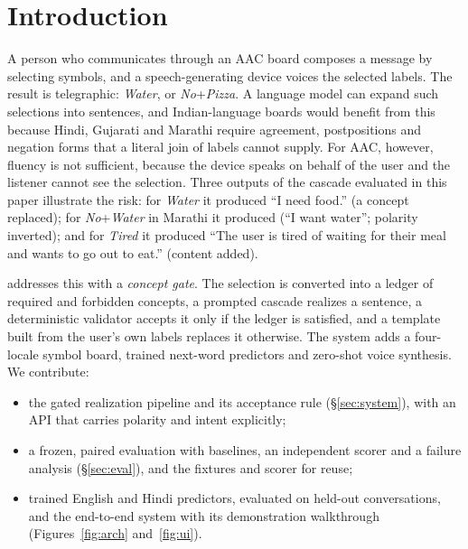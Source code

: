 \section{Introduction}
\label{sec:intro}

A person who communicates through an AAC board composes a message by selecting symbols, and a speech-generating device voices the selected labels.
The result is telegraphic: \emph{Water}, or \emph{No}+\emph{Pizza}. A language model can expand such selections into sentences, and Indian-language boards would benefit from this because Hindi, Gujarati and Marathi require agreement, postpositions and negation forms that a literal join of labels cannot supply.
For AAC, however, fluency is not sufficient, because the device speaks on behalf of the user and the listener cannot see the selection.
Three outputs of the cascade evaluated in this paper illustrate the risk: for \emph{Water} it produced ``I need food.'' (a concept replaced); for \emph{No}+\emph{Water} in Marathi it produced  (``I want water''; polarity inverted); and for \emph{Tired} it produced ``The user is tired of waiting for their meal and wants to go out to eat.'' (content added).

\sys{} addresses this with a \emph{concept gate}. The selection is converted into a ledger of required and forbidden concepts, a prompted cascade realizes a sentence, a deterministic validator accepts it only if the ledger is satisfied, and a template built from the user's own labels replaces it otherwise.
The system adds a four-locale symbol board, trained next-word predictors and zero-shot voice synthesis. We contribute:
\begin{itemize}
\item the gated realization pipeline and its acceptance rule (\S\ref{sec:system}), with an API that carries polarity and intent explicitly;
\item a frozen, paired evaluation with baselines, an independent scorer and a failure analysis (\S\ref{sec:eval}), and the fixtures and scorer for reuse;
\item trained English and Hindi predictors, evaluated on held-out conversations, and the end-to-end system with its demonstration walkthrough (Figures~\ref{fig:arch} and~\ref{fig:ui}).
\end{itemize}
